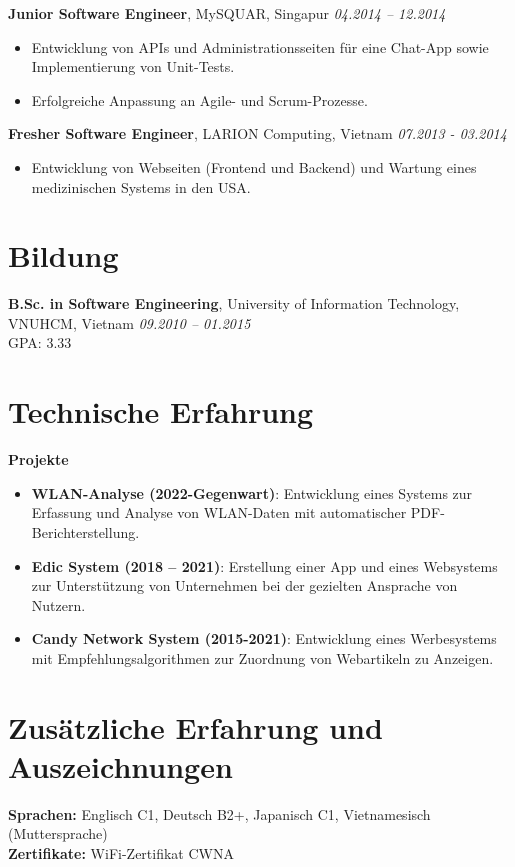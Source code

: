 \documentclass[a4paper,10pt]{article}
\begin{document}
    \textbf{Junior Software Engineer}, MySQUAR, Singapur \hfill \textit{04.2014 – 12.2014}\\
    \begin{itemize}
        \item Entwicklung von APIs und Administrationsseiten für eine Chat-App sowie Implementierung von Unit-Tests.
        \item Erfolgreiche Anpassung an Agile- und Scrum-Prozesse.
    \end{itemize}

    \textbf{Fresher Software Engineer}, LARION Computing, Vietnam \hfill \textit{07.2013 - 03.2014}\\
    \begin{itemize}
        \item Entwicklung von Webseiten (Frontend und Backend) und Wartung eines medizinischen Systems in den USA.
    \end{itemize}

    \section*{Bildung}
    \textbf{B.Sc. in Software Engineering}, University of Information Technology, VNUHCM, Vietnam \hfill \textit{09.2010 – 01.2015}\\
    GPA: 3.33

    \section*{Technische Erfahrung}
    \textbf{Projekte}\\
    \begin{itemize}
        \item \textbf{WLAN-Analyse (2022-Gegenwart)}: Entwicklung eines Systems zur Erfassung und Analyse von WLAN-Daten mit automatischer PDF-Berichterstellung.
        \item \textbf{Edic System (2018 – 2021)}: Erstellung einer App und eines Websystems zur Unterstützung von Unternehmen bei der gezielten Ansprache von Nutzern.
        \item \textbf{Candy Network System (2015-2021)}: Entwicklung eines Werbesystems mit Empfehlungsalgorithmen zur Zuordnung von Webartikeln zu Anzeigen.
    \end{itemize}

    \section*{Zusätzliche Erfahrung und Auszeichnungen}
    \textbf{Sprachen:} Englisch C1, Deutsch B2+, Japanisch C1, Vietnamesisch (Muttersprache)\\
    \textbf{Zertifikate:} WiFi-Zertifikat CWNA
\end{document}
